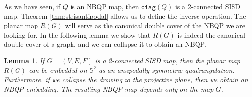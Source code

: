 \documentclass{article}
\newtheorem{lemma}[theorem]{Lemma}
\newcommand{\Sb}[0]{\mathbb{S}}
\newcommand{\diag}[0]{\mathtt{diag}}
\begin{document}
As we have seen, if $Q$ is an NBQP map, then $\diag(Q)$ is a 2-connected SISD map.  Theorem \ref{thm:strisantipodal} allows us to define the inverse operation. 
The planar map $R(G)$ will serve as the canonical double cover of the NBQP we are looking for. In the following lemma we  show that $R(G)$ is indeed the canonical double cover of a graph, and we can collapse it to obtain an NBQP.

\begin{lemma}\label{lem:sisdtoquad}
    If $G=(V,E,F)$ is a 2-connected SISD map, then the planar map $R(G)$ can be embedded on $\Sb^2$ as an antipodally symmetric quadrangulation. Furthermore, if we collapse the drawing to the projective plane, then we obtain an NBQP embedding. The resulting NBQP map depends only on the map $G$.
\end{lemma}
\end{document}
